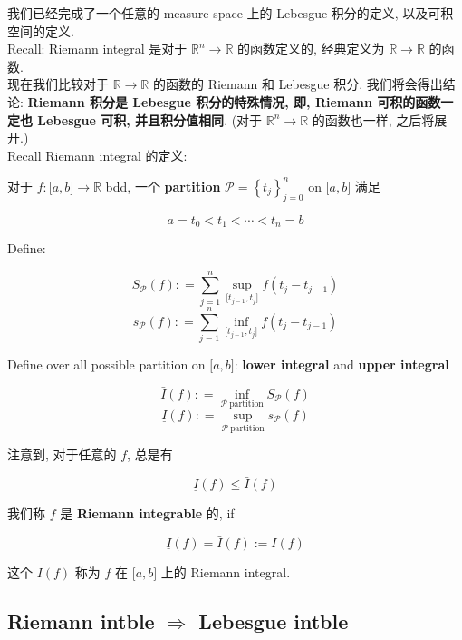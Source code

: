 我们已经完成了一个任意的 measure space 上的 Lebesgue 积分的定义, 以及可积空间的定义.\\
Recall: Riemann integral 是对于 \(\mathbb{R}^{n}\rightarrow\mathbb{R}\) 的函数定义的, 经典定义为 \(\mathbb{R}\rightarrow\mathbb{R}\) 的函数.\\
现在我们比较对于 \(\mathbb{R}\rightarrow\mathbb{R}\) 的函数的 Riemann 和 Lebesgue 积分. 我们将会得出结论: \textbf{Riemann 积分是 Lebesgue 积分的特殊情况, 即, Riemann 可积的函数一定也 Lebesgue 可积, 并且积分值相同}. (对于 \(\mathbb{R}^{n}\rightarrow\mathbb{R}\) 的函数也一样, 之后将展开.)\\
Recall Riemann integral 的定义:

\begin{definition}

对于 \(f:\lbrack a,b\rbrack\rightarrow\mathbb{R}\) bdd, 一个 \textbf{partition} \(\mathcal{P} = \left\{ t_{j} \right\}_{j = 0}^{n}\) on \(\lbrack a,b\rbrack\) 满足

\[a = t_{0} < t_{1} < \cdots < t_{n} = b\]

Define:

\[S_{\mathcal{P}}(f): = \sum\limits_{j = 1}^{n}\sup\limits_{\lbrack t_{j - 1},t_{j}\rbrack}f(t_{j} - t_{j - 1})\]\[s_{\mathcal{P}}(f): = \sum\limits_{j = 1}^{n}\inf\limits_{\lbrack t_{j - 1},t_{j}\rbrack}f(t_{j} - t_{j - 1})\]

Define over all possible partition on \(\lbrack a,b\rbrack\): \textbf{lower integral} and \textbf{upper integral}

\[\bar{I}(f): = \inf\limits_{\mathcal{P}\ \text{partition}}S_{\mathcal{P}}(f)\]\[\underline{I}(f): = \sup\limits_{\mathcal{P}\ \text{partition}}s_{\mathcal{P}}(f)\]

注意到, 对于任意的 \(f\), 总是有

\[\underline{I}(f) \leq \bar{I}(f)\]

我们称 \(f\) 是 \textbf{Riemann integrable} 的, if

\[\underline{I}(f) = \bar{I}(f) := I(f)\]

这个 \(I(f)\) 称为 \(f\) 在 \(\lbrack a,b\rbrack\) 上的 Riemann integral.

\end{definition}

\subsection{\texorpdfstring{Riemann intble \(\Longrightarrow\) Lebesgue intble}{Riemann intble \textbackslash Longrightarrow Lebesgue intble}}

